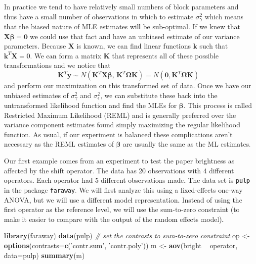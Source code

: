 \documentclass[]{book}
\newenvironment{Shaded}{\begin{snugshade}}{\end{snugshade}}
\newcommand{\KeywordTok}[1]{\textcolor[rgb]{0.13,0.29,0.53}{\textbf{{#1}}}}
\newcommand{\DataTypeTok}[1]{\textcolor[rgb]{0.13,0.29,0.53}{{#1}}}
\newcommand{\StringTok}[1]{\textcolor[rgb]{0.31,0.60,0.02}{{#1}}}
\newcommand{\CommentTok}[1]{\textcolor[rgb]{0.56,0.35,0.01}{\textit{{#1}}}}
\newcommand{\NormalTok}[1]{{#1}}
\theoremstyle{definition}
\theoremstyle{definition}
\theoremstyle{remark}
\begin{document}
In practice we tend to have relatively small numbers of block parameters
and thus have a small number of observations in which to estimate
\(\sigma_{\gamma}^{2}\) which means that the biased nature of MLE
estimates will be sub-optimal. If we knew that
\(\boldsymbol{X}\boldsymbol{\beta}=\boldsymbol{0}\) we could use that
fact and have an unbiased estimate of our variance parameters. Because
\(\boldsymbol{X}\) is known, we can find linear functions
\(\boldsymbol{k}\) such that \(\boldsymbol{k}^{T}\boldsymbol{X}=0\). We
can form a matrix \(\boldsymbol{K}\) that represents all of these
possible transformations and we notice that
\[\boldsymbol{K}^{T}\boldsymbol{y} \sim N \left( \boldsymbol{K}^{T}\boldsymbol{X\beta}, \, \boldsymbol{K}^{T}\boldsymbol{\Omega}\boldsymbol{K}\right) = N\left( \boldsymbol{0}, \boldsymbol{K}^{T}\boldsymbol{\Omega}\boldsymbol{K}\right)\]
and perform our maximization on this transformed set of data. Once we
have our unbiased estimates of \(\sigma_{\gamma}^{2}\) and
\(\sigma_{\epsilon}^{2}\), we can substitute these back into the
untransformed likelihood function and find the MLEs for
\(\boldsymbol{\beta}\). This process is called Restricted Maximum
Likelihood (REML) and is generally preferred over the variance component
estimates found simply maximizing the regular likelihood function. As
usual, if our experiment is balanced these complications aren't
necessary as the REML estimates of \(\boldsymbol{\beta}\) are usually
the same as the ML estimates.

Our first example comes from an experiment to test the paper brightness
as affected by the shift operator. The data has 20 observations with 4
different operators. Each operator had 5 different observations made.
The data set is \texttt{pulp} in the package \texttt{faraway}. We will
first analyze this using a fixed-effects one-way ANOVA, but we will use
a different model representation. Instead of using the first operator as
the reference level, we will use the sum-to-zero constraint (to make it
easier to compare with the output of the random effects model).

\begin{Shaded}
\begin{Highlighting}[]
\KeywordTok{library}\NormalTok{(faraway)}
\KeywordTok{data}\NormalTok{(pulp)}
\CommentTok{# set the contrasts to sum-to-zero constraint}
\NormalTok{op <-}\StringTok{ }\KeywordTok{options}\NormalTok{(}\DataTypeTok{contrasts=}\KeywordTok{c}\NormalTok{(}\StringTok{'contr.sum'}\NormalTok{, }\StringTok{'contr.poly'}\NormalTok{))}
\NormalTok{m <-}\StringTok{ }\KeywordTok{aov}\NormalTok{(bright ~}\StringTok{ }\NormalTok{operator, }\DataTypeTok{data=}\NormalTok{pulp)}
\KeywordTok{summary}\NormalTok{(m)}
\end{Highlighting}
\end{Shaded}
\end{document}

